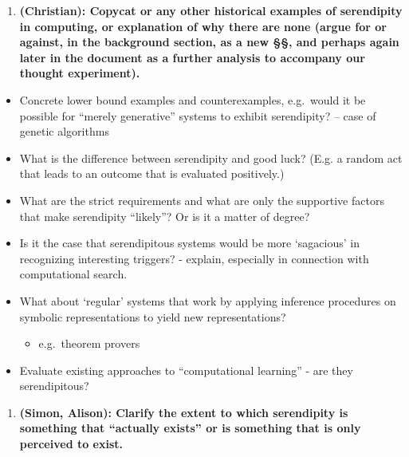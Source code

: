 \begin{enumerate}
\def\labelenumi{\arabic{enumi}.}
\setcounter{enumi}{5}
\itemsep1pt\parskip0pt
\item
  \textbf{(Christian): Copycat or any other historical examples of
  serendipity in computing, or explanation of why there are none (argue
  for or against, in the background section, as a new §§, and perhaps
  again later in the document as a further analysis to accompany our
  thought experiment).}
\end{enumerate}

\begin{itemize}
\itemsep1pt\parskip0pt
\item
  Concrete lower bound examples and counterexamples, e.g.~would it be
  possible for ``merely generative'' systems to exhibit serendipity? --
  case of genetic algorithms
\item
  What is the difference between serendipity and good luck? (E.g. a
  random act that leads to an outcome that is evaluated positively.)
\item
  What are the strict requirements and what are only the supportive
  factors that make serendipity ``likely''? Or is it a matter of degree?
\item
  Is it the case that serendipitous systems would be more `sagacious' in
  recognizing interesting triggers? - explain, especially in connection
  with computational search.
\item
  What about `regular' systems that work by applying inference
  procedures on symbolic representations to yield new representations?

  \begin{itemize}
  \itemsep1pt\parskip0pt
  \item
    e.g.~theorem provers
  \end{itemize}
\item
  Evaluate existing approaches to ``computational learning'' - are they
  serendipitous?
\end{itemize}

\begin{enumerate}
\def\labelenumi{\arabic{enumi}.}
\setcounter{enumi}{6}
\itemsep1pt\parskip0pt
\item
  \textbf{(Simon, Alison): Clarify the extent to which serendipity is
  something that ``actually exists'' or is something that is only
  perceived to exist.}
\end{enumerate}


